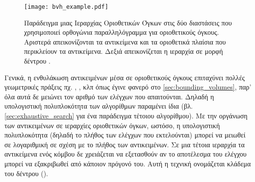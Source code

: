 \begin{figure}[h]
    \centering
    \texttt{[image: bvh\_example.pdf]}
    \caption[Οπτικοποίηση μιας Ιεραρχίας Οριοθετικών Όγκων]{
        Παράδειγμα μιας Ιεραρχίας Οριοθετικών Όγκων στις δύο 
        διαστάσεις που χρησιμοποιεί ορθογώνια παραλληλόγραμμα 
        για οριοθετικούς όγκους.
        Αριστερά απεικονίζονται τα αντικείμενα και τα οριοθετικά 
        πλαίσια που περικλείουν τα αντικείμενα. Δεξιά απεικονίζεται 
        η ιεραρχία σε μορφή δέντρου \cite{enwiki:1094757939}.
        }
    \label{fig:bvh_example_2d}
\end{figure}

Γενικά, η ενθυλάκωση αντικειμένων μέσα σε οριοθετικούς όγκους επιταχύνει 
πολλές γεωμετρικές πράξεις πχ. , ,
κλπ όπως έγινε φανερό στο \ref{sec:bounding_volumes},
παρ' όλα αυτά δε μειώνει τον αριθμό των ελέγχων που απαιτούνται.
Δηλαδή η υπολογιστική πολυπλοκότητα των αλγορίθμων παραμένει ίδια
(βλ. \ref{sec:exhaustive_search} για ένα παράδειγμα τέτοιου αλγορίθμου). 
Με την οργάνωση των αντικειμένων σε ιεραρχίες 
οριοθετικών όγκων, ωστόσο, η υπολογιστική πολυπλοκότητα (δηλαδή το πλήθος 
των ελέγχων που εκτελούνται) μπορεί να μειωθεί 
σε λογαριθμική σε σχέση με το πλήθος των αντικειμένων.
Σε μια τέτοια ιεραρχία τα αντικείμενα ενός κόμβου δε χρειάζεται 
να εξετασθούν αν το αποτέλεσμα του ελέγχου μπορεί να εξακριβωθεί 
από κάποιον πρόγονό του.
Αυτή η τεχνική ονομάζεται κλάδεμα του δέντρου ().

